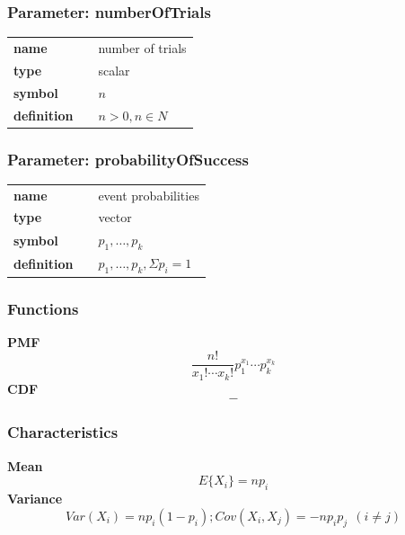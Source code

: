 \subsubsection*{Parameter: numberOfTrials}

\noindent\begin{tabular}{p{2cm}cl}
\textbf{name} & & number of trials \\
\textbf{type} & & scalar \\
\textbf{symbol} & & $n$  \\
\textbf{definition} & & $n > 0, n \in N$
\end{tabular}
\subsubsection*{Parameter: probabilityOfSuccess}

\noindent\begin{tabular}{p{2cm}cl}
\textbf{name} & & event probabilities \\
\textbf{type} & & vector \\
\textbf{symbol} & & $p_1, \ldots, p_k$  \\
\textbf{definition} & & $p_1, \ldots, p_k, \Sigma p_i = 1$
\end{tabular}
\subsubsection*{Functions}

\smallskip \noindent \hspace{.2cm} \textbf{PMF} 
\begin{equation*}\frac{n!}{x_1!\cdots x_k!} p_1^{x_1} \cdots p_k^{x_k}\end{equation*}
\smallskip \noindent \hspace{.2cm} \textbf{CDF} 
\begin{equation*}-\end{equation*}
\smallskip
\subsubsection*{Characteristics}
\smallskip \noindent \hspace{.2cm} \textbf{Mean} 
\begin{equation*}E\{X_i\} = np_i\end{equation*}
\smallskip \noindent \hspace{.2cm} \textbf{Variance} 
\begin{equation*}Var(X_i) = n p_i (1-p_i); 
Cov(X_i,X_j) = - n p_i p_j~~(i\neq j)\end{equation*}
\smallskip
